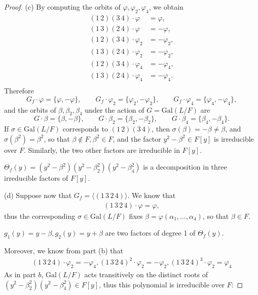\documentclass[11pt,a4paper]{article}
\newcommand{\Gal}{\mathrm{Gal}}
\begin{document}
{\begin{proof}
\item[(c)] By computing the orbits of $\varphi,\varphi_2,\varphi_4$, we obtain
\begin{align*}
(1\,2)(3\,4)\cdot \varphi &= \varphi,\\
(1\,3)(2\,4)\cdot \varphi &= -\varphi,\\
(1\,2)(3\,4)\cdot \varphi_2 &= -\varphi_2,\\
(1\,3)(2\,4)\cdot \varphi_2&= -\varphi_2,\\
(1\,2)(3\,4)\cdot \varphi_4 &= -\varphi_4,\\
(1\,3)(2\,4)\cdot \varphi_4 &= -\varphi_4.\\
\end{align*}
Therefore $$G_f\cdot \varphi = \{\varphi, - \varphi\},\qquad  G_f\cdot \varphi_2 = \{\varphi_2, - \varphi_2\}, \qquad G_f\cdot \varphi_4 = \{\varphi_4, - \varphi_4\},$$
and the orbits of $\beta, \beta_2,\beta_4$ under the action of $G = \Gal(L/F)$ are
$$G\cdot \beta = \{\beta, - \beta\},\qquad G\cdot \beta_2 = \{\beta_2, - \beta_2\}, \qquad G\cdot \beta_4 = \{\beta_4, - \beta_4\}.$$
If $\sigma \in \Gal(L/F)$ corresponds to $(1\,2)(3\,4)$, then $\sigma(\beta) = - \beta \ne \beta$, and $\sigma(\beta^2) = \beta^2$, so that $\beta \not \in F, \beta^2 \in F$, and the factor $y^2-\beta^2 \in F[y]$ is irreducible over $F$. Similarly, the two other factors are irreducible in $F[y]$.

$\Theta_f(y) = (y^2 - \beta^2)(y^2-\beta_2^2)(y^2 - \beta_4^2)$ is a decomposition in three irreducible factors of $F[y]$.

\item[(d)] Suppose now that $G_f = \langle (1\,3\,2\,4)\rangle$. We know that
\begin{align*}
(1\,3\,2\,4) \cdot \varphi =\varphi,
\end{align*}
thus the corresponding $\sigma \in \Gal(L/F)$ fixes $\beta = \varphi(\alpha_1,\ldots,\alpha_4)$, so that $\beta \in F$.

$g_1(y) = y- \beta, g_2(y) = y+ \beta$ are two factors of degree 1 of $\Theta_f(y)$.

Moreover, we know from part (b) that
\begin{align*}
(1\,3\,2\,4)\cdot \varphi_2 = -\varphi_4, (1\,3\,2\,4)^2 \cdot \varphi_2 = -\varphi_2, (1\,3\,2\,4)^3 \cdot \varphi_2 = \varphi_4
\end{align*}
As in part $b$, $\Gal(L/F)$ acts transitively on the distinct roots of $(y^2 - \beta_2^2)(y^2 - \beta_4^2) \in F[y]$, thus this polynomial is irreducible over $F$:


\end{proof}}
\end{document}
